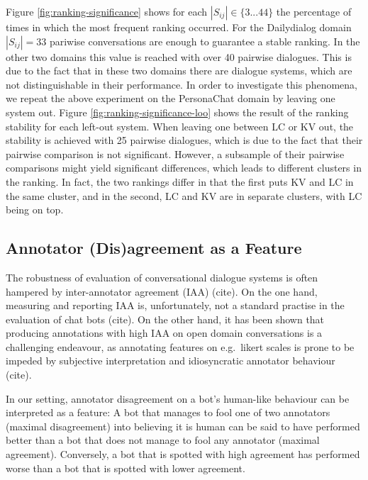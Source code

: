 \documentclass[11pt,a4paper]{article}
\begin{document}
Figure \ref{fig:ranking-significance} shows for each $|S_{ij}| \in \{3 ... 44\}$ the percentage of times in which the most frequent ranking occurred. For the Dailydialog domain $|S_{ij}| = 33$ pariwise conversations are enough to guarantee a stable ranking. In the other two domains this value is reached with over 40 pairwise dialogues. This is due to the fact that in these two domains there are dialogue systems, which are not distinguishable in their performance. In order to investigate this phenomena, we repeat the above experiment on the PersonaChat domain by leaving one system out. Figure \ref{fig:ranking-significance-loo} shows the result of the ranking stability for each left-out system. When leaving one between LC or KV out, the stability is achieved with 25 pairwise dialogues, which is due to the fact that their pairwise comparison is not significant. However, a subsample of their pairwise comparisons might yield significant differences, which leads to different clusters in the ranking. In fact, the two rankings differ in that the first puts KV and LC in the same cluster, and in the second, LC and KV are in separate clusters, with LC being on top.



\subsection{Annotator (Dis)agreement as a Feature}
The robustness of evaluation of conversational dialogue systems is often hampered by inter-annotator agreement (IAA) (cite). %
On the one hand, measuring and reporting IAA is, unfortunately, not a standard practise in the evaluation of chat bots (cite). On the other hand, it has been shown that producing annotations with high IAA on open domain conversations is a challenging endeavour, as annotating features on e.g.\ likert scales is prone to be impeded by subjective interpretation and idiosyncratic annotator behaviour (cite).

In our setting, annotator disagreement on a bot's human-like behaviour can be interpreted as a feature: A bot that manages to fool one of two annotators (maximal disagreement) into believing it is human can be said to have performed better than a bot that does not manage to fool any annotator (maximal agreement). Conversely, a bot that is spotted with high agreement has performed worse than a bot that is spotted with lower agreement.
\end{document}
